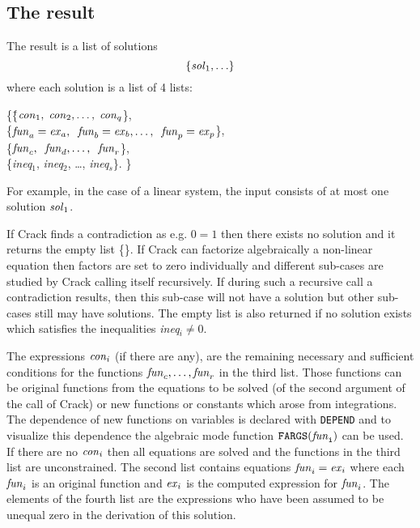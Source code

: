 \documentclass[12pt]{article}
\begin{document}
\subsection{The result}  
The result is a list of solutions 
\[      \{{\it sol}_1, \ldots \}  \]
where each solution is a list of 4 lists:
\begin{tabbing}
    \{\=\{${\it con}_1, \; {\it con}_2, \ldots , \; {\it con}_q$\}, \\
      \>\{${\it fun}_a={\it ex}_a, \;\;
{\it fun}_b={\it ex}_b, \ldots , \;\; {\it fun}_p={\it ex}_p$\},\=  \\
      \>\{${\it fun}_c, \;\; {\it fun}_d, \ldots , \;\; {\it fun}_r$\}, \> \\
      \>\{{\it ineq}$_1$, {\it ineq}$_2$, \ldots , {\it ineq}$_s$\}. \>  \}
\end{tabbing}
For example, in the case of a linear system, the input consists of at
most one solution ${\it sol}_1$.

If {\sc Crack} finds a contradiction as e.g. $0=1$ then there exists no
solution and it returns the empty list \{\}. If {\sc Crack}
can factorize algebraically a non-linear equation then factors are set
to zero individually and different sub-cases are studied by
{\sc Crack} calling itself recursively.
If during such a recursive call a contradiction results,
then this sub-case will not have a solution but other sub-cases still
may have solutions.
The empty list is also returned if no solution exists 
which satisfies the inequalities
{\it ineq}$_i \neq 0.$ 

The expressions ${\it con}_i$ (if there are any), are the
remaining necessary and sufficient conditions for the functions
${\it fun}_c,\ldots,{\it fun}_r$ in the third list. Those
functions can be original functions from the equations to be
solved (of the second argument of the call of {\sc Crack}) or new
functions or constants which arose from integrations. 
The dependence of new functions on variables is declared with {\tt DEPEND}
and to visualize this dependence the algebraic mode function
${\tt FARGS({\it fun}_i)}$ can be used.
If there are no ${\it con}_i$ then all equations are solved and the
functions in the third list are unconstrained. 
The second list contains
equations ${\it fun}_i={\it ex}_i$ where each ${\it fun}_i$ is an
original function and ${\it ex}_i$ is the computed expression
for ${\it fun}_i$.
The elements of the fourth
list are the expressions who have been assumed to be unequal zero
in the derivation of this solution.
\end{document}
